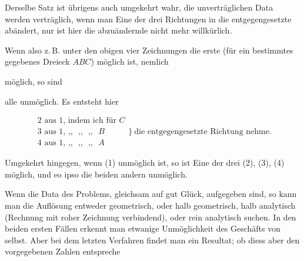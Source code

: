Derselbe Satz ist übrigens auch umgekehrt wahr, die unverträglichen Data
werden verträglich, wenn man Eine der drei Richtungen in die entgegengesetzte
abändert, nur ist hier die abzuändernde nicht mehr willkürlich.

Wenn also z.\,B. unter den obigen vier Zeichnungen die erste (für ein
bestimmtes gegebenes Dreieck $ABC$) möglich ist, nemlich

\begin{center}\end{center}

möglich, so sind

\begin{center}\quad \quad \end{center}

alle unmöglich. Es entsteht hier

\[
\begin{array}{l}
\text{2 aus 1, indem ich für } C\\
\text{3 aus 1, } \text{,,} \text{ } \text{,,} \text{ } \text{,,} \text{ } B\\
\text{4 aus 1, } \text{,,} \text{ } \text{,,} \text{ } \text{,,} \text{ } A
\end{array}
\Big\}\ \text{die entgegengesetzte Richtung nehme.}
\]

Umgekehrt hingegen, wenn (1) unmöglich ist, so ist Eine der drei (2), (3),
(4) möglich, und eo ipso die beiden andern unmöglich.

Wenn die Data des Problems, gleichsam auf gut Glück, aufgegeben sind, so kann
man die Auflösung entweder geometrisch, oder halb geometrisch, halb
analytisch (Rechnung mit roher Zeichnung verbindend), oder rein analytisch
suchen. In den beiden ersten Fällen erkennt man etwanige Unmöglichkeit  des Geschäfts von selbst. Aber bei dem letzten Verfahren findet man  ein Resultat; ob diess aber den vorgegebenen Zahlen entspreche
